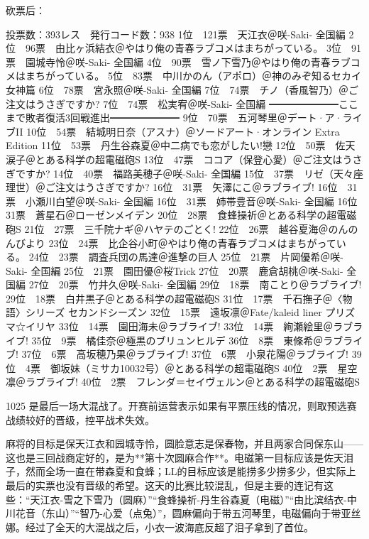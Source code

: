 砍票后：

    投票数：393レス　発行コード数：938
    1位　121票　天江衣＠咲-Saki- 全国編
    2位　96票　由比ヶ浜結衣＠やはり俺の青春ラブコメはまちがっている。
    3位　91票　園城寺怜＠咲-Saki- 全国編
    4位　90票　雪ノ下雪乃＠やはり俺の青春ラブコメはまちがっている。
    5位　83票　中川かのん（アポロ）＠神のみぞ知るセカイ 女神篇
    6位　78票　宮永照＠咲-Saki- 全国編
    7位　74票　チノ（香風智乃）＠ご注文はうさぎですか?
    7位　74票　松実宥＠咲-Saki- 全国編
    ━━━━━━━ここまで敗者復活3回戦進出━━━━━━━
    9位　70票　五河琴里＠デート·ア·ライブII
    10位　54票　結城明日奈（アスナ）＠ソードアート·オンライン Extra Edition
    11位　53票　丹生谷森夏＠中二病でも恋がしたい!戀
    12位　50票　佐天涙子＠とある科学の超電磁砲S
    13位　47票　ココア（保登心愛）＠ご注文はうさぎですか?
    14位　40票　福路美穂子＠咲-Saki- 全国編
    15位　37票　リゼ（天々座理世）＠ご注文はうさぎですか?
    16位　31票　矢澤にこ＠ラブライブ!
    16位　31票　小瀬川白望＠咲-Saki- 全国編
    16位　31票　姉帯豊音＠咲-Saki- 全国編
    16位　31票　蒼星石＠ローゼンメイデン
    20位　28票　食蜂操祈＠とある科学の超電磁砲S
    21位　27票　三千院ナギ＠ハヤテのごとく!
    22位　26票　越谷夏海＠のんのんびより
    23位　24票　比企谷小町＠やはり俺の青春ラブコメはまちがっている。
    24位　23票　調査兵団の馬達＠進撃の巨人
    25位　21票　片岡優希＠咲-Saki- 全国編
    25位　21票　園田優＠桜Trick
    27位　20票　鹿倉胡桃＠咲-Saki- 全国編
    27位　20票　竹井久＠咲-Saki- 全国編
    29位　18票　南ことり＠ラブライブ!
    29位　18票　白井黒子＠とある科学の超電磁砲S
    31位　17票　千石撫子＠〈物語〉シリーズ セカンドシーズン
    32位　15票　遠坂凛＠Fate/kaleid liner プリズマ☆イリヤ
    33位　14票　園田海未＠ラブライブ!
    33位　14票　絢瀬絵里＠ラブライブ!
    35位　9票　橘佳奈＠極黒のブリュンヒルデ
    36位　8票　東條希＠ラブライブ!
    37位　6票　高坂穂乃果＠ラブライブ!
    37位　6票　小泉花陽＠ラブライブ!
    39位　4票　御坂妹（ミサカ10032号）＠とある科学の超電磁砲S
    40位　2票　星空凛＠ラブライブ!
    40位　2票　フレンダ＝セイヴェルン＠とある科学の超電磁砲S

1025 是最后一场大混战了。开赛前运营表示如果有平票压线的情况，则取预选赛战绩较好的晋级，控平战术失效。

麻将的目标是保天江衣和园城寺怜，圆脸意志是保春物，并且两家合同保东山——这也是三回战商定好的，是为**第十次圆麻合作**。电磁第一目标应该是佐天泪子，然而全场一直在带森夏和食蜂；LL的目标应该是能捞多少捞多少，但实际上最后的实票也没有晋级的希望。这天的比赛比较混乱，但是主要的连记有这些：“天江衣-雪之下雪乃（圆麻）”“食蜂操祈-丹生谷森夏（电磁）”“由比滨结衣-中川花音（东山）”“智乃-心爱（点兔）”，圆麻偏向于带五河琴里，电磁偏向于带亚丝娜。经过了全天的大混战之后，小衣一波海底反超了泪子拿到了首位。

